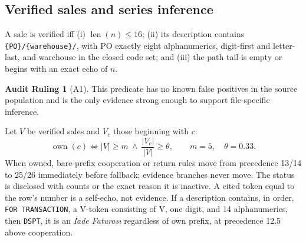 \documentclass[11pt,a4paper]{article}
\theoremstyle{definition}
\newtheorem{ruling}{Audit Ruling}
\begin{document}
\subsection{Verified sales and series inference}
A sale is verified iff (i) $\operatorname{len}(n)\le16$; (ii) its
description contains \texttt{\{PO\}/\{warehouse\}/}, with PO exactly
eight alphanumerics, digit-first and letter-last, and warehouse in the
closed code set; and (iii) the path tail is empty or begins with an exact
echo of $n$.

\begin{ruling}[A1]
This predicate has no known false positives in the source population and
is the only evidence strong enough to support file-specific inference.
\end{ruling}

Let $V$ be verified sales and $V_c$ those beginning with $c$:
\[
\operatorname{own}(c)\iff |V|\ge m\ \wedge\ \frac{|V_c|}{|V|}\ge\theta,
\qquad m=5,\quad\theta=0.33.
\]
When owned, bare-prefix cooperation or return rules move from precedence
13/14 to 25/26 immediately before fallback; evidence branches never
move. The status is disclosed with counts or the exact reason it is
inactive. A cited token equal to the row's number is a self-echo, not
evidence. If a description contains, in order, \texttt{FOR TRANSACTION},
a V-token consisting of V, one digit, and 14 alphanumerics, then
\texttt{DSPT}, it is an \emph{İade Faturası} regardless of own prefix,
at precedence 12.5 above cooperation.
\end{document}
